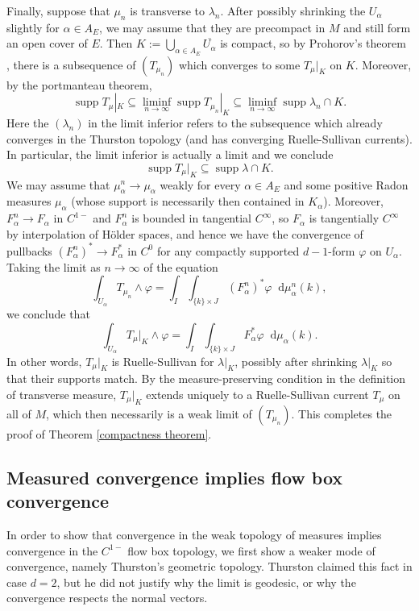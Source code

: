 \documentclass[final,12pt, leqno]{brownthesis}
\DeclareMathOperator{\supp}{supp}
\newcommand*\dif{\mathop{}\!\mathrm{d}}
\theoremstyle{definition}
\numberwithin{equation}{section}
\begin{document}
Finally, suppose that $\mu_n$ is transverse to $\lambda_n$.
After possibly shrinking the $U_\alpha$ slightly for $\alpha \in A_E$, we may assume that they are precompact in $M$ and still form an open cover of $E$.
Then $K := \bigcup_{\alpha \in A_E} \overline{U_\alpha}$ is compact, so by Prohorov's theorem \cite[Theorem 13.29]{klenke2013probability}, there is a subsequence of $(T_{\mu_n})$ which converges to some $T_\mu|_K$ on $K$.
Moreover, by the portmanteau theorem,
$$\supp T_\mu|_K \subseteq \liminf_{n \to \infty} \supp T_{\mu_n}|_K \subseteq \liminf_{n \to \infty} \supp \lambda_n \cap K.$$
Here the $(\lambda_n)$ in the limit inferior refers to the subsequence which already converges in the Thurston topology (and has converging Ruelle-Sullivan currents).
In particular, the limit inferior is actually a limit and we conclude
$$\supp T_\mu|_K \subseteq \supp \lambda \cap K.$$
We may assume that $\mu_\alpha^n \to \mu_\alpha$ weakly for every $\alpha \in A_E$ and some positive Radon measures $\mu_\alpha$ (whose support is necessarily then contained in $K_\alpha$).
Moreover, $F^n_\alpha \to F_\alpha$ in $C^{1-}$ and $F^n_\alpha$ is bounded in tangential $C^\infty$, so $F_\alpha$ is tangentially $C^\infty$ by interpolation of H\"older spaces, and hence we have the convergence of pullbacks $(F^n_\alpha)^* \to F_\alpha^*$ in $C^0$ for any compactly supported $d-1$-form $\varphi$ on $U_\alpha$.
Taking the limit as $n \to \infty$ of the equation 
$$\int_{U_\alpha} T_{\mu_n} \wedge \varphi = \int_I \int_{\{k\} \times J} (F_\alpha^n)^* \varphi \dif \mu_\alpha^n(k),$$
we conclude that
$$\int_{U_\alpha} T_\mu|_K \wedge \varphi = \int_I \int_{\{k\} \times J} F_\alpha^* \varphi \dif \mu_\alpha(k).$$
In other words, $T_\mu|_K$ is Ruelle-Sullivan for $\lambda|_K$, possibly after shrinking $\lambda|_K$ so that their supports match.
By the measure-preserving condition in the definition of transverse measure, $T_\mu|_K$ extends uniquely to a Ruelle-Sullivan current $T_\mu$ on all of $M$, which then necessarily is a weak limit of $(T_{\mu_n})$.
This completes the proof of Theorem \ref{compactness theorem}.


\subsection{Measured convergence implies flow box convergence}
In order to show that convergence in the weak topology of measures implies convergence in the $C^{1-}$ flow box topology, we first show a weaker mode of convergence, namely Thurston's geometric topology.
Thurston claimed this fact \cite[Proposition 8.10.3]{thurston1979geometry} in case $d = 2$, but he did not justify why the limit is geodesic, or why the convergence respects the normal vectors.
\end{document}
